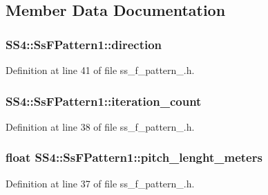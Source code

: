 \subsection{Member Data Documentation}
\subsubsection[{\texorpdfstring{direction}{direction}}]{ S\+S4\+::\+Ss\+F\+Pattern1\+::direction}\hypertarget{structSS4_1_1SsFPattern1_a4f18d9734ab8894ffcdbdaa3673af910}{}\label{structSS4_1_1SsFPattern1_a4f18d9734ab8894ffcdbdaa3673af910}


Definition at line 41 of file ss\+\_\+f\+\_\+pattern\+\_.\+h.

\subsubsection[{\texorpdfstring{iteration\+\_\+count}{iteration_count}}]{ S\+S4\+::\+Ss\+F\+Pattern1\+::iteration\+\_\+count}\hypertarget{structSS4_1_1SsFPattern1_ab86bc79bcbe1b0f61a8aff73c87845ba}{}\label{structSS4_1_1SsFPattern1_ab86bc79bcbe1b0f61a8aff73c87845ba}


Definition at line 38 of file ss\+\_\+f\+\_\+pattern\+\_.\+h.

\subsubsection[{\texorpdfstring{pitch\+\_\+lenght\+\_\+meters}{pitch_lenght_meters}}]{\setlength{\rightskip}{0pt plus 5cm}float S\+S4\+::\+Ss\+F\+Pattern1\+::pitch\+\_\+lenght\+\_\+meters}\hypertarget{structSS4_1_1SsFPattern1_affb031c56b95d731f868bda21bf9c37e}{}\label{structSS4_1_1SsFPattern1_affb031c56b95d731f868bda21bf9c37e}


Definition at line 37 of file ss\+\_\+f\+\_\+pattern\+\_.\+h.

